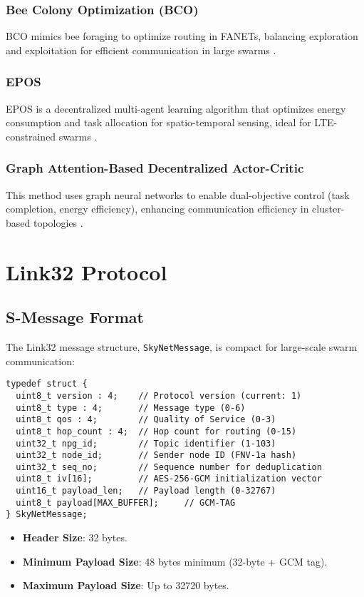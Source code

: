 \documentclass{article}
\begin{document}
\subsubsection{Bee Colony Optimization (BCO)}
BCO mimics bee foraging to optimize routing in FANETs, balancing exploration and exploitation for efficient communication in large swarms \cite{Bitencourt2016, Karaboga2012}.

\subsubsection{EPOS}
EPOS is a decentralized multi-agent learning algorithm that optimizes energy consumption and task allocation for spatio-temporal sensing, ideal for LTE-constrained swarms \cite{Chen2019, Liu2021}.

\subsubsection{Graph Attention-Based Decentralized Actor-Critic}
This method uses graph neural networks to enable dual-objective control (task completion, energy efficiency), enhancing communication efficiency in cluster-based topologies \cite{Zhang2020, Wang2021}.



\section{Link32 Protocol}

\subsection{S-Message Format}
The Link32 message structure, \texttt{SkyNetMessage}, is compact for large-scale swarm
communication:
\begin{lstlisting}
typedef struct {
  uint8_t version : 4;    // Protocol version (current: 1)
  uint8_t type : 4;       // Message type (0-6)
  uint8_t qos : 4;        // Quality of Service (0-3)
  uint8_t hop_count : 4;  // Hop count for routing (0-15)
  uint32_t npg_id;        // Topic identifier (1-103)
  uint32_t node_id;       // Sender node ID (FNV-1a hash)
  uint32_t seq_no;        // Sequence number for deduplication
  uint8_t iv[16];         // AES-256-GCM initialization vector
  uint16_t payload_len;   // Payload length (0-32767)
  uint8_t payload[MAX_BUFFER];     // GCM-TAG
} SkyNetMessage;
\end{lstlisting}
\begin{itemize}
    \item \textbf{Header Size}: 32 bytes.
    \item \textbf{Minimum Payload Size}: 48 bytes minimum (32-byte + GCM tag).
    \item \textbf{Maximum Payload Size}: Up to 32720 bytes.
\end{itemize}
\end{document}
